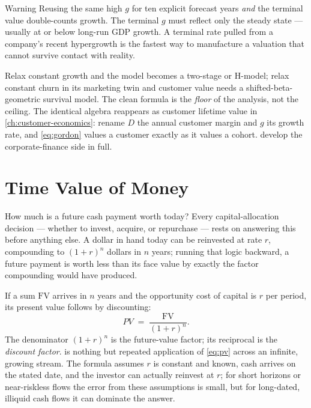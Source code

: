 \begin{admonition}{Warning}
Reusing the same high \(g\) for ten explicit forecast years \emph{and} the terminal value
double-counts growth. The terminal \(g\) must reflect only the steady state --- usually at
or below long-run GDP growth. A terminal rate pulled from a company's recent hypergrowth is
the fastest way to manufacture a valuation that cannot survive contact with reality.
\end{admonition}

Relax constant growth and the model becomes a two-stage or H-model; relax constant churn in
its marketing twin and customer value needs a shifted-beta-geometric survival model. The
clean formula is the \emph{floor} of the analysis, not the ceiling. The identical algebra
reappears as customer lifetime value in \cref{ch:customer-economics}: rename \(D\) the annual
customer margin and \(g\) its growth rate, and \cref{eq:gordon} values a customer exactly as
it values a cohort. \textcite{brealey2020} develop the corporate-finance side in full.

\section{Time Value of Money}\label{sec:time-value-of-money}

How much is a future cash payment worth today? Every capital-allocation decision --- whether
to invest, acquire, or repurchase --- rests on answering this before anything else. A dollar
in hand today can be reinvested at rate \(r\), compounding to \((1+r)^n\) dollars in \(n\)
years; running that logic backward, a future payment is worth less than its face value by
exactly the factor compounding would have produced.

If a sum \(\mathrm{FV}\) arrives in \(n\) years and the opportunity cost of capital is \(r\)
per period, its present value follows by discounting:
\begin{equation}\label{eq:pv}
  PV \;=\; \frac{\mathrm{FV}}{(1+r)^{n}}.
\end{equation}
The denominator \((1+r)^{n}\) is the future-value factor; its reciprocal is the
\emph{discount factor}.  is nothing but repeated application of \cref{eq:pv}
across an infinite, growing stream. The formula assumes \(r\) is constant and known, cash
arrives on the stated date, and the investor can actually reinvest at \(r\); for short
horizons or near-riskless flows the error from these assumptions is small, but for
long-dated, illiquid cash flows it can dominate the answer.

